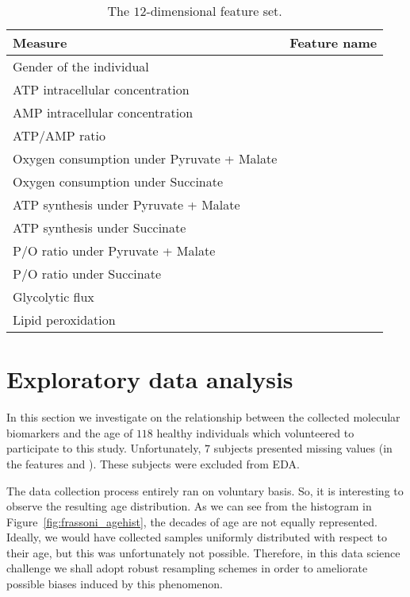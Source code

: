 \begin{table}[]
	\centering
	\caption{The $12$-dimensional feature set.}
	\label{tab:aging_features}
	\begin{tabular}{@{}ll@{}}
		\toprule
		\textbf{Measure}                                    & \textbf{Feature name}\\ \midrule
		Gender of the individual                      & \gender          \\
		ATP intracellular concentration            & \atp         \\
		AMP intracellular concentration            & \amp         \\
		ATP/AMP ratio                              & \atpamp      \\
		Oxygen consumption under Pyruvate + Malate & \copyrmal    \\
		Oxygen consumption under Succinate         & \cosucc      \\
		ATP synthesis under Pyruvate + Malate      & \atppyrmal   \\
		ATP synthesis under Succinate              & \atpsucc     \\
		P/O ratio under Pyruvate + Malate          & \popyrmal    \\
		P/O ratio under Succinate                  & \posucc      \\
		Glycolytic flux                            & \ldh         \\
		Lipid peroxidation                         & \mda         \\ \bottomrule
	\end{tabular}
\end{table}


\section{Exploratory data analysis} \label{sec:frassoni_EDA}
In this section we investigate on the relationship between the collected molecular biomarkers and the age of $118$ healthy individuals which volunteered to participate to this study.
Unfortunately, $7$ subjects presented missing values (in the features \ldh and \gender). These subjects were excluded from EDA.


The data collection process entirely ran on voluntary basis. So, it is interesting to observe the resulting age distribution. As we can see from the histogram in Figure~\ref{fig:frassoni_agehist}, the decades of age are not equally represented. Ideally, we would have collected samples uniformly distributed with respect to their age, but this was unfortunately not possible. Therefore, in this data science challenge we shall adopt robust resampling schemes in order to ameliorate possible biases induced by this phenomenon.

